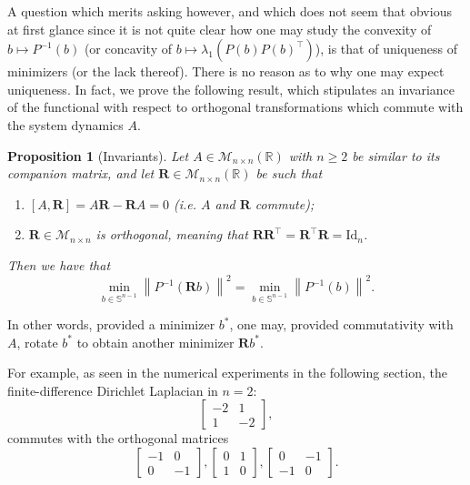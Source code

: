 \documentclass[11pt, a4paper, reqno]{amsart}
\newcommand{\R}{\mathbb{R}}
\def\*#1{\mathbf{#1}}
\theoremstyle{plain}
\numberwithin{equation}{section}
\newtheorem{proposition}{Proposition}[section]
\begin{document}
	A question which merits asking however, and which does not seem that obvious at first glance since it is not quite clear how one may study the convexity of $b\longmapsto P^{-1}(b)$ (or concavity of $b\longmapsto\lambda_1\left(P(b)P(b)^\top\right)$), is that of uniqueness of minimizers (or the lack thereof). 
	There is no reason as to why one may expect uniqueness. In fact, we prove the following result, which stipulates an invariance of the functional with respect to orthogonal transformations which commute with the system dynamics $A$. 
	
	\begin{proposition}[Invariants] \label{prop: invariants}
	Let $A\in\mathcal{M}_{n\times n}(\R)$ with $n\geqslant2$ be similar to its companion matrix, and let $\*R\in \mathcal{M}_{n\times n}(\R)$ be such that 
	\begin{enumerate}
	\item $[A, \*R]=A\*R-\*RA=0$ (i.e. $A$ and $\*R$ commute);
	\item $\*R\in \mathcal{M}_{n\times n}$ is orthogonal, meaning that $\*R\*R^\top=\*R^\top \*R=\mathrm{Id}_n$.
	\end{enumerate}
	Then we have that
	\begin{equation}
	\min_{b\in\mathbb{S}^{n-1}}\left\|P^{-1}(\*Rb)\right\|^2 = \min_{b\in\mathbb{S}^{n-1}}\left\|P^{-1}(b)\right\|^2.
	\end{equation}
	\end{proposition}	
	\medskip
	
	\noindent
	In other words, provided a minimizer $b^*$, one may, provided commutativity with $A$, rotate $b^*$ to obtain another minimizer $\*Rb^*$.
	
	For example, as seen in the numerical experiments in the following section, the finite-difference Dirichlet Laplacian in $n=2$:
	\begin{equation*}
	\begin{bmatrix}
	-2 & 1\\
	1 & -2
	\end{bmatrix},
	\end{equation*}
	commutes with the orthogonal matrices
	\begin{equation*}
	\begin{bmatrix}-1&0\\0&-1\end{bmatrix}, \begin{bmatrix}0&1\\1&0\end{bmatrix}, \begin{bmatrix}0&-1\\-1&0\end{bmatrix}.
	\end{equation*}
	
\end{document}
